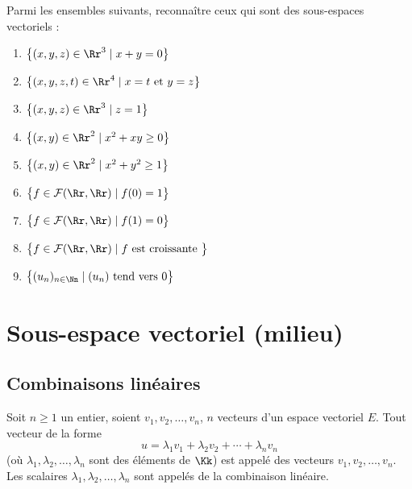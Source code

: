 \documentclass[class=report,crop=false]{standalone}
\begin{document}
\begin{miniexercices}
Parmi les ensembles suivants, reconnaître ceux qui sont des sous-espaces
vectoriels :
  \begin{enumerate}
    \item $\big\{(x,y,z)\in \Rr^3 \mid  x+y=0\big\}$
    \item $\big\{(x,y,z,t)\in \Rr^4 \mid  x=t \text{ et } y=z\big\}$
    \item $\big\{(x,y,z)\in \Rr^3 \mid z=1\big\}$
    \item $\big\{(x,y)\in \Rr^2 \mid x^2+xy\ge 0\big\}$
    \item $\big\{(x,y)\in \Rr^2 \mid x^2+y^2 \ge 1\big\}$
    \item $\big\{f \in \mathcal{F}(\Rr,\Rr) \mid f(0)=1\big\}$
    \item $\big\{f \in \mathcal{F}(\Rr,\Rr) \mid f(1)=0\big\}$
    \item $\big\{f \in \mathcal{F}(\Rr,\Rr) \mid f \text{ est croissante }\big\}$
    \item $\big\{ (u_n)_{n\in\Nn} \mid (u_n) \text{ tend vers } 0 \big\}$
  \end{enumerate}
\end{miniexercices}



\section{Sous-espace vectoriel (milieu)}

\subsection{Combinaisons linéaires}

\begin{definition}
Soit $n\ge1$ un entier, soient  $v_1, v_2, \ldots, v_n$, $n$  vecteurs d'un espace vectoriel $E$.
Tout vecteur de la forme
$$u=\lambda_1 v_1+\lambda_2v_2+ \cdots + \lambda_n v_n$$
(où $\lambda_1, \lambda_2, \ldots,  \lambda_n$ sont des éléments de $\Kk$)
est appelé  des vecteurs $v_1, v_2, \ldots, v_n$.
Les scalaires $\lambda_1, \lambda_2, \ldots , \lambda_n$ sont appelés  de la combinaison linéaire.
\end{definition}
\end{document}
